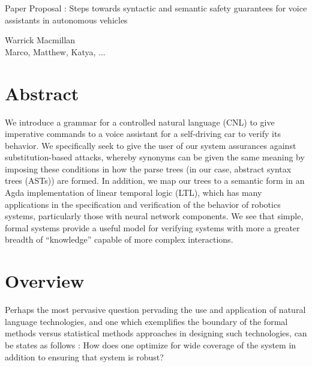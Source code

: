 \documentclass[a4paper, 11pt]{article}
\begin{document}

\begin{titlepage}

\vspace*{1cm}

\begin{center} \Large Paper Proposal : Steps towards syntactic and semantic
  safety guarantees for voice assistants in autonomous vehicles  \\ 


\vspace{1.5cm}

\large Warrick Macmillan  \\
\large Marco, Matthew, Katya, ... \end{center}

\end{titlepage}

\section{Abstract} 

We introduce a grammar for a controlled natural language (CNL) to give
imperative commands to a voice assistant for a self-driving car to 
verify its behavior. We specifically seek to give the user of our
system assurances against substitution-based attacks, whereby synonyms can be
given the same meaning by imposing these conditions in how the parse trees (in
our case, abstract syntax trees (ASTs)) are formed. In addition, we map our
trees to a semantic form in an Agda implementation of linear temporal logic
(LTL), which has many applications in the specification and verification of the
behavior of robotics systems, particularly those with neural network components.
We see that simple, formal systems provide a useful model for verifying systems
with more a greater breadth of ``knowledge'' capable of more complex
interactions.

\section{Overview}

Perhaps the most pervasive question pervading the use and application of natural
language technologies, and one which exemplifies the boundary of the formal
methods versus statistical methods approaches in designing such technologies,
can be states as follows : How does one optimize for wide coverage of the system
in addition to ensuring that system is robust?
\end{document}
